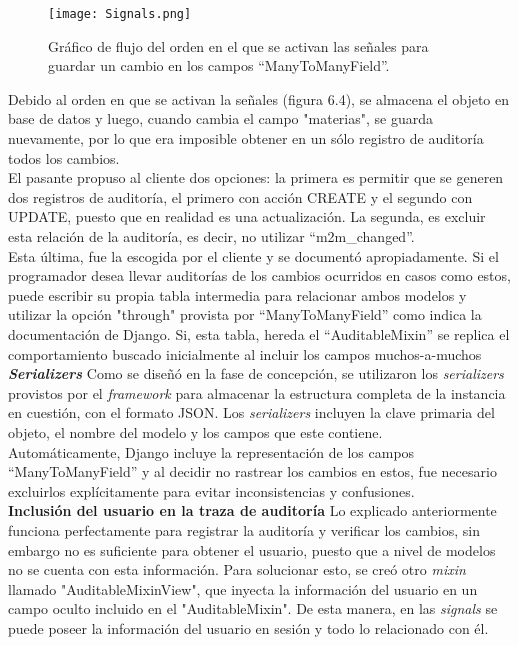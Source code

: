 \begin{figure}[h]
\centering
\texttt{[image: Signals.png]}
\caption{Gráfico de flujo del orden en el que se activan las señales para guardar un cambio en los campos “ManyToManyField”.}
\label{fig:figura6.4}
\end{figure}

Debido al orden en que se activan la señales (figura 6.4), se almacena el objeto en base de datos y luego, cuando cambia el campo "materias", se guarda nuevamente, por lo que era imposible obtener en un sólo registro de auditoría todos los cambios.\\

El pasante propuso al cliente dos opciones: la primera es permitir que se generen dos registros de auditoría, el primero con acción CREATE y el segundo con UPDATE, puesto que en realidad es una actualización. La segunda, es excluir esta relación de la auditoría, es decir, no utilizar “m2m\_changed”.\\

Esta última, fue la escogida por el cliente y se documentó apropiadamente. Si el programador desea llevar auditorías de los cambios ocurridos en casos como estos, puede escribir su propia tabla intermedia para relacionar ambos modelos y utilizar la opción "through" provista por “ManyToManyField” como indica la documentación de Django. Si, esta tabla, hereda el “AuditableMixin” se replica el comportamiento buscado inicialmente al incluir los campos muchos-a-muchos\\

\textbf{\textit{Serializers}}  Como se diseñó en la fase de concepción, se utilizaron los \textit{serializers} provistos por el \textit{framework} para almacenar la estructura completa de la instancia en cuestión, con el formato JSON. Los \textit{serializers} incluyen la clave primaria del objeto, el nombre del modelo y los campos que este contiene.\\

Automáticamente, Django incluye la representación de los campos “ManyToManyField” y al decidir no rastrear los cambios en estos, fue necesario excluirlos explícitamente para evitar inconsistencias y confusiones.\\

\textbf{Inclusión del usuario en la traza de auditoría}  Lo explicado anteriormente funciona perfectamente para registrar la auditoría y verificar los cambios, sin embargo no es suficiente para obtener el usuario, puesto que a nivel de modelos no se cuenta con esta información. Para solucionar esto, se creó otro \textit{mixin} llamado "AuditableMixinView", que inyecta la información del usuario en un campo oculto incluido en el "AuditableMixin". De esta manera, en las \textit{signals} se puede poseer la información del usuario en sesión y todo lo relacionado con él.

